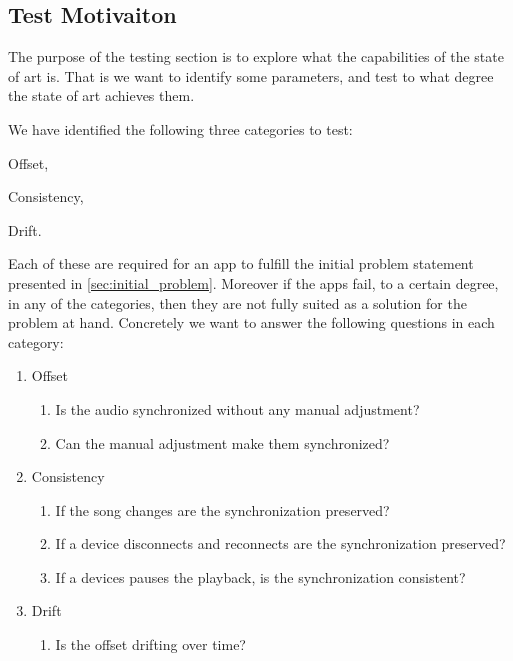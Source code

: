 \subsection{Test Motivaiton}
The purpose of the testing section is to explore what the capabilities of the state of art is.
That is we want to identify some parameters, and test to what degree the state of art achieves them.

We have identified the following three categories to test:
\begin{enumerate*}[label=(\alph*)]
    \item Offset,
    \item Consistency,
    \item Drift.
\end{enumerate*}

Each of these are required for an app to fulfill the initial problem statement presented in \vref{sec:initial_problem}.
Moreover if the apps fail, to a certain degree, in any of the categories, then they are not fully suited as a solution for the problem at hand. 
Concretely we want to answer the following questions in each category:
\begin{enumerate}[label=(\alph*)]
    \item Offset
    \begin{enumerate}[label=(\arabic*)]
        \item Is the audio synchronized without any manual adjustment?
        \item Can the manual adjustment make them synchronized?
    \end{enumerate} 
    \item Consistency
    \begin{enumerate}[start=3,label=(\arabic*)]
        \item If the song changes are the synchronization preserved?
        \item If a device disconnects and reconnects are the synchronization preserved?
        \item If a devices pauses the playback, is the synchronization consistent?
    \end{enumerate}
    \item Drift
    \begin{enumerate}[start=6,label=(\arabic*)]
        \item Is the offset drifting over time?
    \end{enumerate}
\end{enumerate}

